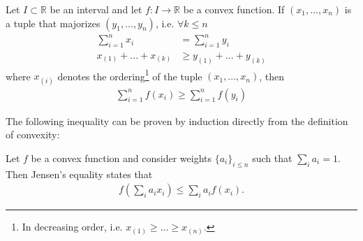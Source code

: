     \begin{theorem}
        Let $I\subset\mathbb{R}$ be an interval and let $f:I\rightarrow\mathbb{R}$ be a convex function. If $(x_1, ..., x_n)$ is a tuple that majorizes $(y_1, ..., y_n)$, i.e. $\forall k\leq n$
        \begin{align}
            \sum_{i=1}^nx_i &= \sum_{i=1}^ny_i\\
            x_{(1)} + ... + x_{(k)}&\geq y_{(1)} + ... + y_{(k)}
        \end{align}
        where $x_{(i)}$ denotes the ordering\footnote{In decreasing order, i.e. $x_{(1)}\geq...\geq x_{(n)}$.} of the tuple $(x_1, ..., x_n)$, then
        \begin{gather}
            \sum_{i=1}^nf(x_i)\geq \sum_{i=1}^nf(y_i)
        \end{gather}
    \end{theorem}
    The following inequality can be proven by induction directly from the definition of convexity:
    \begin{theorem}
        Let $f$ be a convex function and consider weights $\{a_i\}_{i\leq n}$ such that $\sum_ia_i=1$. Then Jensen's equality states that
        \begin{gather}
            \label{linalgebra:jensen_inequality}
            f\left(\sum_ia_ix_i\right) \leq \sum_ia_if(x_i).
        \end{gather}
    \end{theorem}
